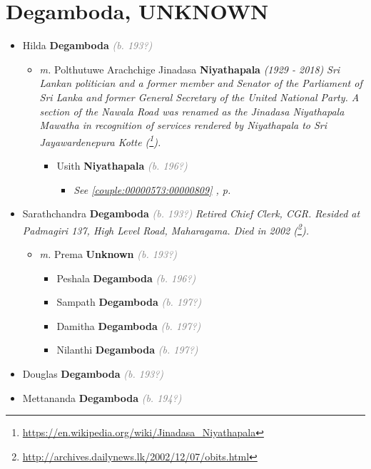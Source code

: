 \documentclass[10pt, openany]{book}
\begin{document}
\chapter{Degamboda, UNKNOWN}
\label{00003684}
\textcolor{slmaroon}{\textit{}}
\begin{itemize}
\item{Hilda \textbf{Degamboda} \textcolor{gray}{\textit{(b. 193?)}}
\begin{itemize}
\item{\textit{m.} Polthutuwe Arachchige Jinadasa \textbf{Niyathapala} \textcolor{slorange}{\textit{(1929 - 2018)}} \textcolor{slmaroon}{\textit{Sri Lankan politician and a former member and Senator of the Parliament of Sri Lanka and former General Secretary of the United National Party. A section of the Nawala Road was renamed as the Jinadasa Niyathapala Mawatha in recognition of services rendered by Niyathapala to Sri Jayawardenepura Kotte (\footnote{\url{https://en.wikipedia.org/wiki/Jinadasa_Niyathapala}}).}}   \label{couple:00003682:00003683} \begin{itemize}
\item{Usith \textbf{Niyathapala} \textcolor{gray}{\textit{(b. 196?)}}
\begin{itemize}
\item{\textcolor{slteal}{\textit{See  \autoref{couple:00000573:00000809} \textit{, p. \pageref{couple:00000573:00000809} }}}}
\end{itemize}
 }
\end{itemize}}
\end{itemize}
 }
\item{Sarathchandra \textbf{Degamboda} \textcolor{gray}{\textit{(b. 193?)}} \textcolor{slmaroon}{\textit{Retired Chief Clerk, CGR.
Resided at Padmagiri 137, High Level Road, Maharagama.
Died in 2002 (\footnote{\url{http://archives.dailynews.lk/2002/12/07/obits.html}}).}}
\begin{itemize}
\item{\textit{m.} Prema \textbf{Unknown} \textcolor{gray}{\textit{(b. 193?)}}   \label{couple:00003685:00003686} \begin{itemize}
\item{Peshala \textbf{Degamboda} \textcolor{gray}{\textit{(b. 196?)}}
 }
\item{Sampath \textbf{Degamboda} \textcolor{gray}{\textit{(b. 197?)}}
 }
\item{Damitha \textbf{Degamboda} \textcolor{gray}{\textit{(b. 197?)}}
 }
\item{Nilanthi \textbf{Degamboda} \textcolor{gray}{\textit{(b. 197?)}}
 }
\end{itemize}}
\end{itemize}
 }
\item{Douglas \textbf{Degamboda} \textcolor{gray}{\textit{(b. 193?)}}
 }
\item{Mettananda \textbf{Degamboda} \textcolor{gray}{\textit{(b. 194?)}}
 }
\end{itemize}
\end{document}
